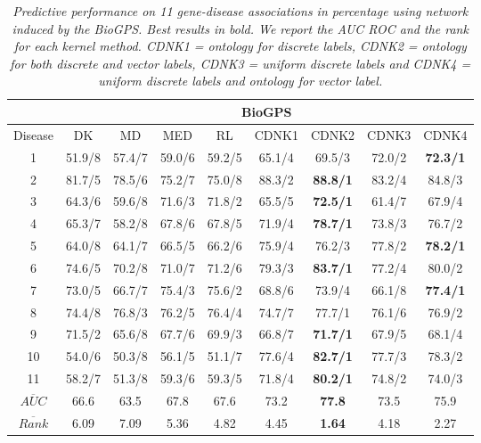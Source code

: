 \documentclass[review]{elsarticle}
\begin{document}
\begin{table}
\caption{\textit {Predictive performance on 11 gene-disease associations in percentage using network induced by the BioGPS. Best results in bold. We report the AUC ROC and the rank for each kernel method.  CDNK1 = ontology for discrete labels, CDNK2 = ontology for both discrete and vector labels, CDNK3 = uniform discrete labels and CDNK4 = uniform discrete labels and ontology for vector label.}} \vspace{1em}
\centering
\setlength{\tabcolsep}{1mm}
\begin{tabular}{|c|c|c|c|c|c|c|c|c|}
\hline
         & \multicolumn{8}{c|}{\textbf{BioGPS}}\\
 \hline
Disease & DK & MD & MED & RL & CDNK1 & CDNK2 & CDNK3 & CDNK4\\

 \hline
1 & 51.9/8 & 57.4/7 & 59.0/6 & 59.2/5 & 65.1/4 & 69.5/3 & 72.0/2 & \textbf{72.3/1} \\

2 & 81.7/5 & 78.5/6 & 75.2/7 & 75.0/8 & 88.3/2 & \textbf{88.8/1} & 83.2/4 & 84.8/3 \\

3 & 64.3/6 & 59.6/8 & 71.6/3 & 71.8/2 & 65.5/5 & \textbf{72.5/1} & 61.4/7 & 67.9/4 \\

4 & 65.3/7 & 58.2/8 & 67.8/6 & 67.8/5 & 71.9/4 & \textbf{78.7/1} & 73.8/3 & 76.7/2 \\

5 & 64.0/8 & 64.1/7 & 66.5/5 & 66.2/6 & 75.9/4 & 76.2/3 & 77.8/2 & \textbf{78.2/1} \\

6 & 74.6/5 & 70.2/8 & 71.0/7 & 71.2/6 & 79.3/3 & \textbf{83.7/1} & 77.2/4 & 80.0/2 \\

7 & 73.0/5 & 66.7/7 & 75.4/3 & 75.6/2 & 68.8/6 & 73.9/4 & 66.1/8 & \textbf{77.4/1} \\

8 & 74.4/8 & 76.8/3 & 76.2/5 & 76.4/4 & 74.7/7 & 77.7/1 & 76.1/6 & 76.9/2 \\

9 & 71.5/2 & 65.6/8 & 67.7/6 & 69.9/3 & 66.8/7 & \textbf{71.7/1} & 67.9/5 & 68.1/4 \\

10 & 54.0/6 & 50.3/8 & 56.1/5 & 51.1/7 & 77.6/4 & \textbf{82.7/1} & 77.7/3 & 78.3/2 \\

11 & 58.2/7 & 51.3/8 & 59.3/6 & 59.3/5 & 71.8/4 & \textbf{80.2/1} & 74.8/2 & 74.0/3 \\

\hline
$\overline{AUC}$ & 66.6	& 63.5 & 67.8 &	67.6 & 73.2 & \textbf{77.8} & 73.5 & 75.9 \\


$\overline{Rank}$ & 6.09 & 7.09 &  5.36 & 4.82 & 4.45 & \textbf{1.64} & 4.18 & 2.27 \\
 \hline 
\end{tabular}
\label{fig:cdnk-biogps}
\end{table}
\end{document}
